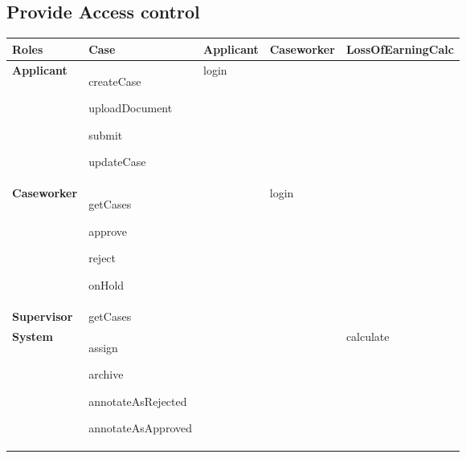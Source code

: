 \newpage
\subsection{Provide Access control}

\begin{table}[htb!]
\begin{tabularx}{\textwidth}{l|X|X|X|X}
	\textbf{Roles} & \textbf{Case} & \textbf{Applicant} & \textbf{Caseworker} & \textbf{LossOfEarningCalc}\\
	\hline
	\textbf{Applicant} & 
	\begin{compactitem}
	    \item createCase
	    \item uploadDocument
	    \item submit
	    \item updateCase
	\end{compactitem}  &  login & & \\
	\hline
	\textbf{Caseworker} & 
	\begin{compactitem} 
	    \item getCases
	    \item approve
	    \item reject
	    \item onHold
	\end{compactitem} & & login & \\
	\hline
	\textbf{Supervisor} & getCases & & & \\
	\hline
	\textbf{System} & 
	\begin{compactitem}
	    \item assign
	    \item archive
	    \item annotateAsRejected
	    \item annotateAsApproved
	\end{compactitem} & & & calculate\\
\end{tabularx}
\end{table}